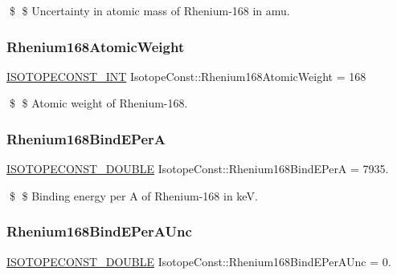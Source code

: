 \$ \$ Uncertainty in atomic mass of Rhenium-\/168 in amu. \mbox{\label{group___isotope_const-_rhenium-_re168_gab79878bcc2d55ced5d3a5346a87dc7cb}} 
\subsubsection{\texorpdfstring{Rhenium168\+Atomic\+Weight}{Rhenium168AtomicWeight}}
{\footnotesize\ttfamily \mbox{\hyperlink{group___isotope_const-_macros_ga5f18360b3e99483a35c32d789e62621c}{I\+S\+O\+T\+O\+P\+E\+C\+O\+N\+S\+T\+\_\+\+I\+NT}} Isotope\+Const\+::\+Rhenium168\+Atomic\+Weight = 168}

\$ \$ Atomic weight of Rhenium-\/168. \mbox{\label{group___isotope_const-_rhenium-_re168_gabaa4d07d36b1e96c9332840d11b9b2c1}} 
\subsubsection{\texorpdfstring{Rhenium168\+Bind\+E\+PerA}{Rhenium168BindEPerA}}
{\footnotesize\ttfamily \mbox{\hyperlink{group___isotope_const-_macros_ga8f45a7272ce02c0b4c65c44636ed719a}{I\+S\+O\+T\+O\+P\+E\+C\+O\+N\+S\+T\+\_\+\+D\+O\+U\+B\+LE}} Isotope\+Const\+::\+Rhenium168\+Bind\+E\+PerA = 7935.}

\$ \$ Binding energy per A of Rhenium-\/168 in keV. \mbox{\label{group___isotope_const-_rhenium-_re168_gad7d1491bb29ac5d48e3ce3efd0b9373b}} 
\subsubsection{\texorpdfstring{Rhenium168\+Bind\+E\+Per\+A\+Unc}{Rhenium168BindEPerAUnc}}
{\footnotesize\ttfamily \mbox{\hyperlink{group___isotope_const-_macros_ga8f45a7272ce02c0b4c65c44636ed719a}{I\+S\+O\+T\+O\+P\+E\+C\+O\+N\+S\+T\+\_\+\+D\+O\+U\+B\+LE}} Isotope\+Const\+::\+Rhenium168\+Bind\+E\+Per\+A\+Unc = 0.}

